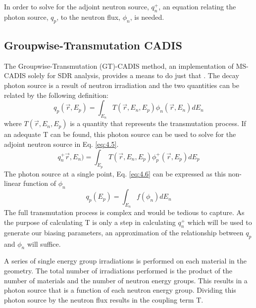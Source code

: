 In order to solve for the adjoint neutron source, $q_n^{+}$, an equation
relating the photon source, $q_p$, to the neutron flux, $\phi_n$, is needed.

\subsection{Groupwise-Transmutation CADIS}
The Groupwise-Transmutation (GT)-CADIS method, an implementation of MS-CADIS
solely for SDR analysis, provides a means to do just that \cite{gtcadis}.
The decay photon source is a result of neutron irradiation and 
the two quantities can be related by the following
definition:
\begin{equation} \label{eq:4.6}
	q_p(\overrightarrow{r}, E_{p}) = 
	\int_{E_n}T(\overrightarrow{r}, E_{n}, E_{p})
	\phi_{n}(\overrightarrow{r}, E_{n}) dE_{n}
\end{equation}
where $T(\overrightarrow{r}, E_{n}, E_{p})$ is a quantity that represents the
transmutation process.  If an adequate T can be found, this photon source can
be used to solve for the adjoint neutron source in Eq. \ref{eq:4.5}.
\begin{equation} \label{eq:4.7}
        q_{n}^{+}\overrightarrow{r},E_{n})
        = \int_{E_p}T(\overrightarrow{r}, E_{n}, E_{p})
	\phi_{p}^{+}(\overrightarrow{r}, E_{p}) dE_{p}
\end{equation}
The photon source at a single point, Eq. \ref{eq:4.6} can be
expressed as this non-linear function of $\phi_n$ 
\begin{equation} \label{eq:4.8}
	q_{p}(E_{p}) = \int_{E_n} f(\phi_{n}) dE_{n}
\end{equation}
The full transmutation process is complex and would be
tedious to capture.  As the purpose of calculating T is only a step in
calculating $q_{n}^{+}$ which will be used to generate our biasing parameters,
an approximation of the relationship between $q_p$ and $\phi_n$ will suffice.  


A series of single energy group irradiations is performed on each material in
the geometry.  The total number of irradiations performed is the product of the
number of materials and the number of neutron energy groups.  This results in
a photon source that is a function of each neutron energy group.  Dividing this
photon source by the neutron flux results in the coupling term T.

